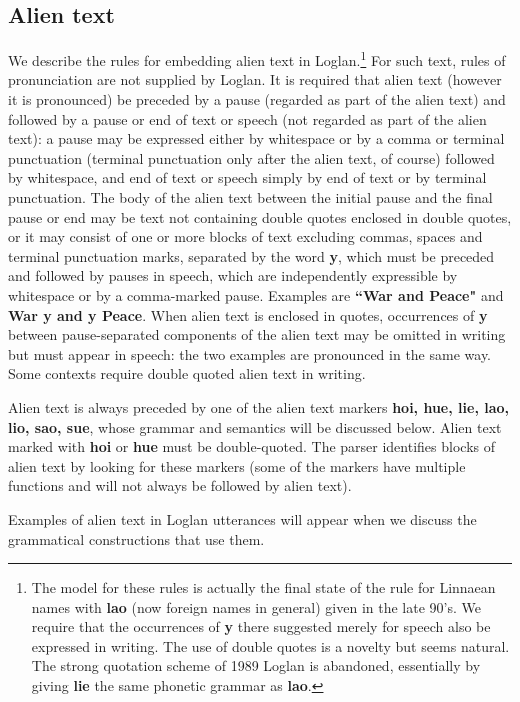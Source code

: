 \documentclass[12pt]{book}
\begin{document}
\subsection{Alien text}

We describe the rules for embedding alien text in Loglan.\footnote{The model for these rules is actually the final state of the rule for Linnaean names with {\bf lao} (now foreign names in general) given in the late 90's.  We require that the occurrences of {\bf y} there suggested merely for speech also be expressed in writing.  The use of double quotes is a novelty but seems natural.  The strong quotation scheme of 1989 Loglan is abandoned, essentially by giving {\bf lie} the same phonetic grammar as {\bf lao}.}  For such text, rules of pronunciation are not supplied by Loglan.  It is required that alien text (however it is pronounced)
be preceded by a pause (regarded as part of the alien text) and followed by a pause or end of text or speech (not regarded as part of the alien text):  a pause may be expressed either by whitespace or by a comma or terminal punctuation (terminal punctuation only after the alien text, of course)  followed by whitespace, and end of text or speech simply by end of text or by terminal punctuation.  The body of the alien text between the initial pause and the final pause or end may be text not containing double quotes enclosed in double quotes, or it may consist of one or more blocks of text excluding commas, spaces and terminal punctuation marks, separated by the word {\bf y}, which must be preceded and followed by pauses in speech, which are independently expressible by whitespace or by a comma-marked pause.  Examples are {\bf``War and Peace"} and {\bf War y and y Peace}.   When alien text is enclosed in quotes, occurrences of {\bf y} between pause-separated components of the alien text may be omitted in writing but must appear in speech:  the two examples are pronounced in the same way.  Some contexts require double quoted alien text in writing.

Alien text is always preceded by one of the alien text markers {\bf hoi, hue, lie, lao, lio, sao, sue}, whose grammar and semantics will be discussed below.  Alien text marked with
{\bf hoi} or {\bf hue} must be double-quoted.   The parser identifies blocks of alien text by looking for these markers (some of the markers have multiple functions and will not always be followed by alien text).

Examples of alien text in Loglan utterances will appear when we discuss the grammatical constructions that use them.
\end{document}

